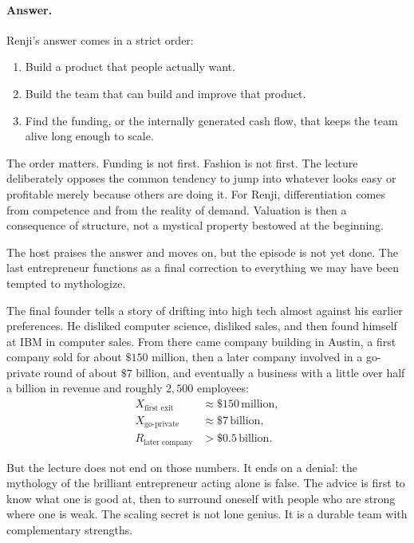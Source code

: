 \paragraph{Answer.} Renji's answer comes in a strict order:
\begin{enumerate}
\item Build a product that people actually want.
\item Build the team that can build and improve that product.
\item Find the funding, or the internally generated cash flow, that keeps the team alive long enough to scale.
\end{enumerate}

The order matters. Funding is not first. Fashion is not first. The lecture deliberately opposes the common tendency to jump into whatever looks easy or profitable merely because others are doing it. For Renji, differentiation comes from competence and from the reality of demand. Valuation is then a consequence of structure, not a mystical property bestowed at the beginning.

The host praises the answer and moves on, but the episode is not yet done. The last entrepreneur functions as a final correction to everything we may have been tempted to mythologize.

The final founder tells a story of drifting into high tech almost against his earlier preferences. He disliked computer science, disliked sales, and then found himself at IBM in computer sales. From there came company building in Austin, a first company sold for about \(\$150\) million, then a later company involved in a go-private round of about \(\$7\) billion, and eventually a business with a little over half a billion in revenue and roughly \(2{,}500\) employees:
\begin{align}
X_{\text{first exit}} &\approx \$150\,\text{million},\\
X_{\text{go-private}} &\approx \$7\,\text{billion},\\
R_{\text{later company}} &> \$0.5\,\text{billion}.
\end{align}

But the lecture does not end on those numbers. It ends on a denial: the mythology of the brilliant entrepreneur acting alone is false. The advice is first to know what one is good at, then to surround oneself with people who are strong where one is weak. The scaling secret is not lone genius. It is a durable team with complementary strengths.

